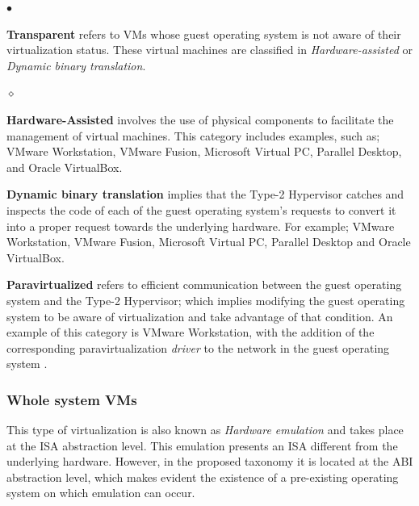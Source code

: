 	\begin{list}{$\bullet$}{\setlength{\leftmargin}{5pt}}
		
			\item \textbf{Transparent} refers to VMs whose guest operating system is not aware of their virtualization status. These virtual machines are classified in \textit{Hardware-assisted} or \textit{Dynamic binary translation}.
			
			\begin{list}{$\diamond$}{\setlength{\leftmargin}{8pt}}

				\item \textbf {Hardware-Assisted} involves the use of physical components to facilitate the management of virtual machines. This category includes examples, such as; VMware Workstation, VMware Fusion, Microsoft Virtual PC, Parallel Desktop, and Oracle VirtualBox.
				
				\item \textbf{Dynamic binary translation} implies that the Type-2 Hypervisor catches and inspects the code of each of the guest operating system's requests to convert it into a proper request towards the underlying hardware. For example; VMware Workstation, VMware Fusion, Microsoft Virtual PC, Parallel Desktop and Oracle VirtualBox.
			\end{list}
			
			\item \textbf {Paravirtualized} refers to efficient communication between the guest operating system and the Type-2 Hypervisor; which implies modifying the guest operating system to be aware of virtualization and take advantage of that condition. An example of this category is VMware Workstation, with the addition of the corresponding paravirtualization \textit{driver} to the network in the guest operating system \cite {VMware2018Website}.
			
		\end{list}	

	\subsubsection{Whole system VMs}
	This type of virtualization is also known as \textit{Hardware emulation} and takes place at the ISA abstraction level.  This emulation presents an ISA different from the underlying hardware. However, in the proposed taxonomy it is located at the ABI abstraction level, which makes evident the existence of a pre-existing operating system on which emulation can occur.
	
